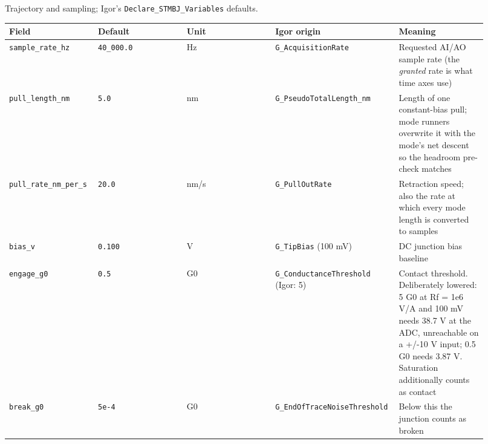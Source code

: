 Trajectory and sampling; Igor's \texttt{Declare\_\discretionary{}{}{}STMBJ\_\discretionary{}{}{}Variables} defaults.

\footnotesize\setlength{\LTleft}{0pt}\setlength{\LTright}{\fill}
\begin{longtable}{@{}>{\raggedright\arraybackslash}p{0.184\linewidth}>{\raggedright\arraybackslash}p{0.184\linewidth}>{\raggedright\arraybackslash}p{0.184\linewidth}>{\raggedright\arraybackslash}p{0.184\linewidth}>{\raggedright\arraybackslash}p{0.184\linewidth}@{}}
\toprule
\textbf{Field} & \textbf{Default} & \textbf{Unit} & \textbf{Igor origin} & \textbf{Meaning} \\
\midrule\endhead
\texttt{sample\_\discretionary{}{}{}rate\_\discretionary{}{}{}hz} & \texttt{40\_\discretionary{}{}{}000.\discretionary{}{}{}0} & Hz & \texttt{G\_\discretionary{}{}{}Acquisition\discretionary{}{}{}Rate} & Requested AI/AO sample rate (the \emph{granted} rate is what time axes use) \\
\texttt{pull\_\discretionary{}{}{}length\_\discretionary{}{}{}nm} & \texttt{5.\discretionary{}{}{}0} & nm & \texttt{G\_\discretionary{}{}{}Pseudo\discretionary{}{}{}Total\discretionary{}{}{}Length\_\discretionary{}{}{}nm} & Length of one constant-bias pull; mode runners overwrite it with the mode's net descent so the headroom pre-check matches \\
\texttt{pull\_\discretionary{}{}{}rate\_\discretionary{}{}{}nm\_\discretionary{}{}{}per\_\discretionary{}{}{}s} & \texttt{20.\discretionary{}{}{}0} & nm/s & \texttt{G\_\discretionary{}{}{}Pull\discretionary{}{}{}Out\discretionary{}{}{}Rate} & Retraction speed; also the rate at which every mode length is converted to samples \\
\texttt{bias\_\discretionary{}{}{}v} & \texttt{0.\discretionary{}{}{}100} & V & \texttt{G\_\discretionary{}{}{}Tip\discretionary{}{}{}Bias} (100 mV) & DC junction bias baseline \\
\texttt{engage\_\discretionary{}{}{}g0} & \texttt{0.\discretionary{}{}{}5} & G0 & \texttt{G\_\discretionary{}{}{}Conductance\discretionary{}{}{}Threshold} (Igor: 5) & Contact threshold. Deliberately lowered: 5 G0 at Rf = 1e6 V/A and 100 mV needs 38.7 V at the ADC, unreachable on a +/-10 V input; 0.5 G0 needs 3.87 V. Saturation additionally counts as contact \\
\texttt{break\_\discretionary{}{}{}g0} & \texttt{5e-4} & G0 & \texttt{G\_\discretionary{}{}{}End\discretionary{}{}{}Of\discretionary{}{}{}Trace\discretionary{}{}{}Noise\discretionary{}{}{}Threshold} & Below this the junction counts as broken \\

\end{longtable}
